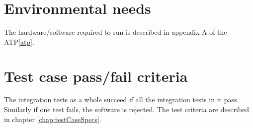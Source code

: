 \section{Environmental needs}
The hardware/software required to run \applicationname{} is described in appendix A of the ATP\ref{atp}.

\section{Test case pass/fail criteria}
The integration tests as a whole succeed if all the integration tests in it pass. Similarly if one test fails, the software is rejected.
The test criteria are described in chapter \ref{chap:testCaseSpecs}.
